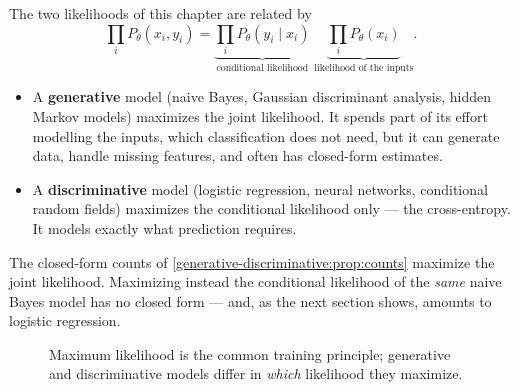 \begin{notechapter}
The two likelihoods of this chapter are related by
\[
  \prod_i P_\theta(x_i,y_i) = \underbrace{\prod_i P_\theta(y_i\mid x_i)}_{\text{conditional likelihood}}\;\underbrace{\prod_iP_\theta(x_i)}_{\text{likelihood of the inputs}} .
\]
\begin{itemize}
  \item A \textbf{generative} model (naive Bayes, Gaussian discriminant
        analysis, hidden Markov models) maximizes the joint likelihood. It
        spends part of its effort modelling the inputs, which classification
        does not need, but it can generate data, handle missing features, and
        often has closed-form estimates.
  \item A \textbf{discriminative} model (logistic regression, neural networks,
        conditional random fields) maximizes the conditional likelihood only
        --- the cross-entropy. It models exactly what prediction requires.
\end{itemize}
The closed-form counts of \cref{generative-discriminative:prop:counts} maximize
the joint likelihood. Maximizing instead the conditional likelihood of the
\emph{same} naive Bayes model has no closed form --- and, as the next section
shows, amounts to logistic regression.

\begin{figure}[ht]
\centering
{}
\caption{Maximum likelihood is the common training principle; generative and
discriminative models differ in \emph{which} likelihood they maximize.}
\label{generative-discriminative:fig:hierarchy}
\end{figure}


\end{notechapter}
